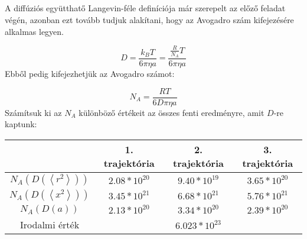 \section{} \label{sec:3}
\\ \\
A diffúziós együtthatő Langevin-féle definíciója már szerepelt az előző feladat végén, azonban ezt tovább tudjuk alakítani, hogy az Avogadro szám kifejezésére alkalmas legyen.

\begin{equation}
    D
    =
    \frac{k_{B} T}{6 \pi \eta a}
    =
    \frac{\tfrac{R}{N_{A}} T}{6 \pi \eta a}
\end{equation}
Ebből pedig kifejezhetjük az Avogadro számot:

\begin{equation}
    N_{A} = \frac{R T}{6 D \pi \eta a}
\end{equation}
Számítsuk ki az $N_{A}$ különböző értékeit az összes fenti eredményre, amit $D$-re kaptunk:

\begin{center}
\label{tab:7}
\begin{tabular}{||c|c|c|c||}
    \toprule
                                             & 1. trajektória  & 2. trajektória  & 3. trajektória  \\ \hline \hline
    $N_{A} \left( D \left( \left< r^{2} \right> \right) \right)$  & $2.08*10^{20}$  & $9.40*10^{19}$  & $3.65*10^{20}$ \\ \hline
    $N_{A} \left( D \left( \left< x^{2} \right> \right) \right)$  & $3.45*10^{21}$  & $6.68*10^{21}$  & $5.76*10^{21}$ \\ \hline
    $N_{A} \left( D \left( a \right) \right)$                     & $2.13*10^{20}$  & $3.34*10^{20}$  & $2.39*10^{20}$  \\ \hline
    Irodalmi érték                                                & \multicolumn{3}{c||}{$6.023*10^{23}$} \\
    \bottomrule
\end{tabular}
\end{center}

